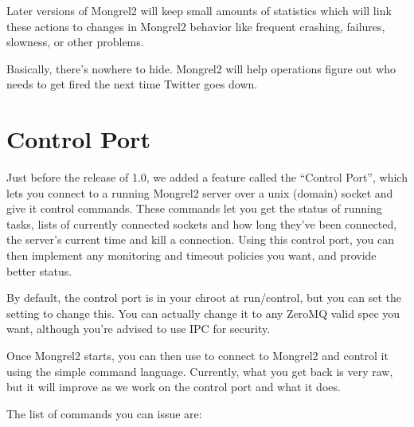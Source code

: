 Later versions of Mongrel2 will keep small amounts of statistics which will link these actions
to changes in Mongrel2 behavior like frequent crashing, failures, slowness, or other problems.

Basically, there's nowhere to hide.  Mongrel2 will help operations figure out who needs to
get fired the next time Twitter goes down.


\section{Control Port}

Just before the release of 1.0, we added a feature called the ``Control Port'', which
lets you connect to a running Mongrel2 server over a unix (domain) socket and
give it control commands.  These commands let you get the status of running
tasks, lists of currently connected sockets and how long they've been connected,
the server's current time and kill a connection.  Using this control port, you
can then implement any monitoring and timeout policies you want, and provide
better status.

By default, the control port is in your chroot at run/control, but you can set
the  setting to change this.  You can actually change it
to any ZeroMQ valid spec you want, although you're advised to use IPC for security.

Once Mongrel2 starts, you can then use  to connect to Mongrel2 and
control it using the simple command language.  Currently, what you get back is
very raw, but it will improve as we work on the control port and what it does.

The list of commands you can issue are:

